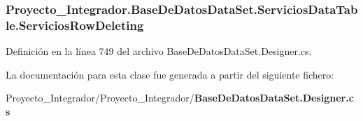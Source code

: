 \subsubsection[{Servicios\-Row\-Deleting}]{ Proyecto\-\_\-\-Integrador.\-Base\-De\-Datos\-Data\-Set.\-Servicios\-Data\-Table.\-Servicios\-Row\-Deleting}\label{class_proyecto___integrador_1_1_base_de_datos_data_set_1_1_servicios_data_table_ac5157095819f1b30177f6f0dd2f813f5}


Definición en la línea 749 del archivo Base\-De\-Datos\-Data\-Set.\-Designer.\-cs.



La documentación para esta clase fue generada a partir del siguiente fichero\-:\begin{DoxyCompactItemize}
\item 
Proyecto\-\_\-\-Integrador/\-Proyecto\-\_\-\-Integrador/{\bf Base\-De\-Datos\-Data\-Set.\-Designer.\-cs}\end{DoxyCompactItemize}
